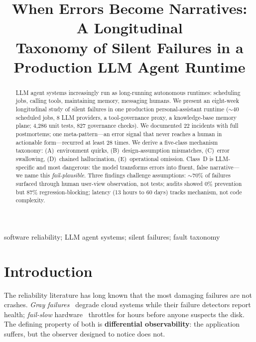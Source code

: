 \documentclass[conference]{IEEEtran}
\newcommand{\failplausible}{\emph{fail-plausible}}
\begin{document}
\title{When Errors Become Narratives: A Longitudinal\\Taxonomy of Silent
Failures in a Production LLM Agent Runtime}

\author{
}

\maketitle

\begin{abstract}
LLM agent systems increasingly run as long-running autonomous runtimes:
scheduling jobs, calling tools, maintaining memory, messaging humans. We
present an eight-week longitudinal study of silent failures in one
production personal-assistant runtime ($\sim$40 scheduled jobs, 8 LLM
providers, a tool-governance proxy, a knowledge-base memory plane;
4{,}286 unit tests, 827 governance checks). We documented 22 incidents
with full postmortems; one meta-pattern---an error signal that never
reaches a human in actionable form---recurred at least 28 times. We
derive a five-class mechanism taxonomy: (A)~environment quirks,
(B)~design-assumption mismatches, (C)~error swallowing, (D)~chained
hallucination, (E)~operational omission. Class~D is LLM-specific and most
dangerous: the model transforms errors into fluent, false narrative---we
name this \failplausible. Three findings challenge assumptions:
$\sim$70\% of failures surfaced through human user-view observation, not
tests; audits showed 0\% prevention but 87\% regression-blocking; latency
(13 hours to 60 days) tracks mechanism, not code complexity.
\end{abstract}

\begin{IEEEkeywords}
software reliability; LLM agent systems; silent failures; fault taxonomy
\end{IEEEkeywords}

\section{Introduction}
The reliability literature has long known that the most damaging failures
are not crashes. \emph{Gray failures}~\cite{huang2017gray} degrade cloud
systems while their failure detectors report health; \emph{fail-slow}
hardware~\cite{gunawi2018failslow} throttles for hours before anyone
suspects the disk. The defining property of both is \textbf{differential
observability}: the application suffers, but the observer designed to
notice does not.
\end{document}
